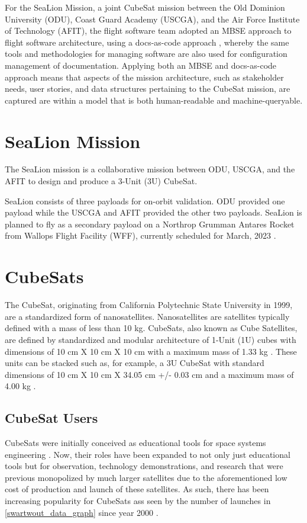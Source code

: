 \documentclass[conf]{new-aiaa}
\begin{document}
For the SeaLion Mission, a joint CubeSat mission between the Old Dominion University (ODU), Coast Guard Academy (USCGA), and the Air Force Institute of Technology (AFIT), the flight software team adopted an MBSE approach to flight software architecture, using a docs-as-code approach \cite{docs_as_code}, whereby the same tools and methodologies for managing software are also used for configuration management of documentation. Applying both an MBSE and docs-as-code approach means that aspects of the mission architecture, such as stakeholder needs, user stories, and data structures pertaining to the CubeSat mission, are captured are within a model that is both human-readable and machine-queryable.

\section{SeaLion Mission}

The SeaLion mission is a collaborative mission between ODU, USCGA, and the AFIT to design and produce a 3-Unit (3U) CubeSat.

SeaLion consists of three payloads for on-orbit validation.  ODU provided one payload while the USCGA and AFIT provided the other two payloads.  SeaLion is planned to fly as a secondary payload on a Northrop Grumman Antares Rocket from Wallops Flight Facility (WFF), currently scheduled for March, 2023 \cite{sealion_cdr}.

\section{CubeSats}

The CubeSat, originating from California Polytechnic State University in 1999, are a standardized form of nanosatellites.  Nanosatellites are satellites typically defined with a mass of less than 10 kg.  CubeSats, also known as Cube Satellites, are defined by standardized and modular architecture of 1-Unit (1U) cubes with dimensions of 10 cm X 10 cm X 10 cm with a maximum mass of 1.33 kg \cite{cubesat_standard}.  These units can be stacked such as, for example, a 3U CubeSat with standard dimensions of 10 cm X 10 cm X 34.05 cm +/- 0.03 cm and a maximum mass of 4.00 kg \cite{cubesat_standard}.

\subsection{CubeSat Users}

CubeSats were initially conceived as educational tools for space systems engineering \cite{heidt_new}.  Now, their roles have been expanded to not only just educational tools but for observation, technology demonstrations, and research that were previous monopolized by much larger satellites due to the aforementioned low cost of production and launch of these satellites.  As such, there has been increasing popularity for CubeSats ass seen by the number of launches in \ref{swartwout_data_graph} since year 2000 \cite{swartwout_data}.
\end{document}
